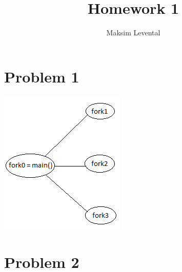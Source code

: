 \documentclass[11pt]{article} %
\title{Homework 1}
\author{Maksim Levental}
\begin{document}
\maketitle

\section*{Problem 1}

\includegraphics{problem1.png}

\section*{Problem 2}
\end{document}
